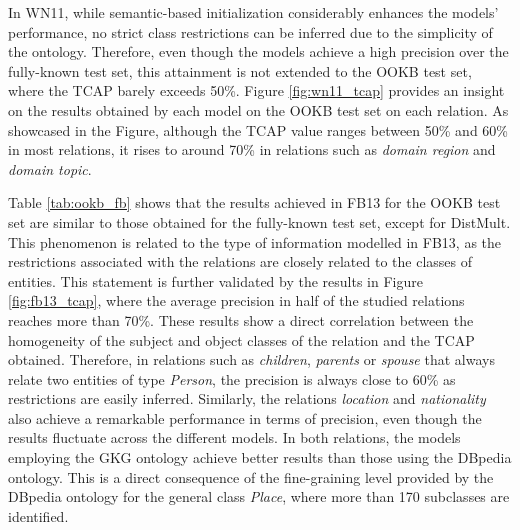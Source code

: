 In WN11, while semantic-based initialization considerably enhances the models' performance, no strict class restrictions can be inferred due to the simplicity of the ontology. Therefore, even though the models achieve a high precision over the fully-known test set, this attainment is not extended to the OOKB test set, where the TCAP barely exceeds 50\%. Figure \ref{fig:wn11_tcap} provides an insight on the results obtained by each model on the OOKB test set on each relation. As showcased in the Figure, although the TCAP value ranges between 50\% and 60\% in most relations, it rises to around 70\% in relations such as \textit{domain region} and \textit{domain topic}.

Table \ref{tab:ookb_fb} shows that the results achieved in FB13 for the OOKB test set are similar to those obtained for the fully-known test set, except for DistMult. This phenomenon is related to the type of information modelled in FB13, as the restrictions associated with the relations are closely related to the classes of entities. This statement is further validated by the results in Figure \ref{fig:fb13_tcap}, where the average precision in half of the studied relations reaches more than 70\%. These results show a direct correlation between the homogeneity of the subject and object classes of the relation and the TCAP obtained. Therefore, in relations such as \textit{children}, \textit{parents} or \textit{spouse} that always relate two entities of type \textit{Person}, the precision is always close to 60\% as restrictions are easily inferred. Similarly, the relations \textit{location} and \textit{nationality} also achieve a remarkable performance in terms of precision, even though the results fluctuate across the different models. In both relations, the models employing the GKG ontology achieve better results than those using the DBpedia ontology. This is a direct consequence of the fine-graining level provided by the DBpedia ontology for the general class \textit{Place}, where more than 170 subclasses are identified.

